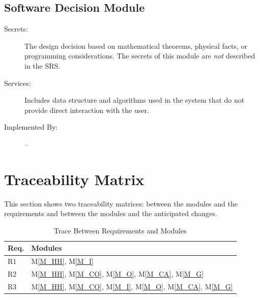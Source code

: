 \documentclass[12pt, titlepage]{article}
\newcommand{\mref}[1]{M\ref{#1}}
\begin{document}
\subsection{Software Decision Module}

\begin{description}
\item[Secrets:] The design decision based on mathematical theorems, physical
  facts, or programming considerations. The secrets of this module are
  \emph{not} described in the SRS.
\item[Services:] Includes data structure and algorithms used in the system that
  do not provide direct interaction with the user. 
\item[Implemented By:] --
\end{description}

\newpage

\section{Traceability Matrix} \label{SecTM}

This section shows two traceability matrices: between the modules and the
requirements and between the modules and the anticipated changes.

\begin{table}[H]
\centering
\begin{tabular}{p{} p{}}
\toprule
\textbf{Req.} & \textbf{Modules}\\
\midrule
R1 & \mref{M_HH}, \mref{M_I} \\
R2 & \mref{M_HH}, \mref{M_CO}, \mref{M_O}, \mref{M_CA}, \mref{M_G} \\
R3 & \mref{M_HH}, \mref{M_CO}, \mref{M_I}, \mref{M_O}, \mref{M_CA}, \mref{M_G} \\
\bottomrule
\end{tabular}
\caption{Trace Between Requirements and Modules}
\label{TblRT}
\end{table}
\end{document}
